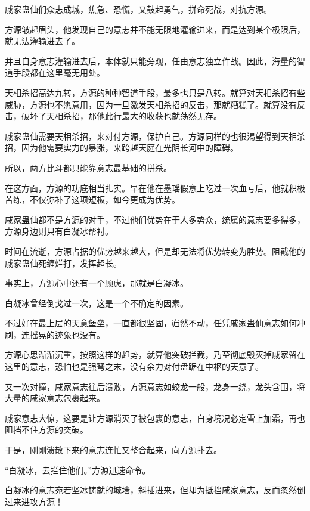 
\begin{this_body}



戚家蛊仙们众志成城，焦急、恐慌，又鼓起勇气，拼命死战，对抗方源。

方源皱起眉头，他发现自己的意志并不能无限地灌输进来，而是达到某个极限后，就无法灌输进去了。

并且自身意志灌输进去后，本体就只能旁观，任由意志独立作战。因此，海量的智道手段都在这里毫无用处。

天相杀招高达九转，方源的种种智道手段，最多也只是八转。就算对天相杀招有些威胁，方源也不愿意用，因为一旦激发天相杀招的反击，那就糟糕了。就算没有反击，破坏了天相杀招，那他此行最大的收获也就荡然无存。

戚家蛊仙需要天相杀招，来对付方源，保护自己。方源同样的也很渴望得到天相杀招，因为他需要实力的暴涨，来跨越天庭在光阴长河中的障碍。

所以，两方比斗都只能靠意志最基础的拼杀。

在这方面，方源的功底相当扎实。早在他在墨瑶假意上吃过一次血亏后，他就积极苦练，不仅弥补了这项短板，如今更成为优势。

戚家蛊仙都不是方源的对手，不过他们优势在于人多势众，统属的意志要多得多，方源身边则只有白凝冰帮衬。

时间在流逝，方源占据的优势越来越大，但是却无法将优势转变为胜势。阻截他的戚家蛊仙死缠烂打，发挥超长。

事实上，方源心中还有一个顾虑，那就是白凝冰。

白凝冰曾经倒戈过一次，这是一个不确定的因素。

不过好在最上层的天意堡垒，一直都很坚固，岿然不动，任凭戚家蛊仙意志如何冲刷，连摇晃的迹象也没有。

方源心思渐渐沉重，按照这样的趋势，就算他突破拦截，乃至彻底毁灭掉戚家留在这里的意志，恐怕也是强弩之末，没有余力对付盘踞在中枢的天意了。

又一次对撞，戚家意志往后溃败，方源意志如蛟龙一般，龙身一绕，龙头含围，将大量的戚家意志包裹起来。

戚家意志大惊，这要是让方源消灭了被包裹的意志，自身境况必定雪上加霜，再也阻挡不住方源的突破。

于是，刚刚溃散下来的意志连忙又整合起来，向方源扑去。

“白凝冰，去拦住他们。”方源迅速命令。

白凝冰的意志宛若坚冰铸就的城墙，斜插进来，但却为抵挡戚家意志，反而忽然倒过来进攻方源！


\end{this_body}
